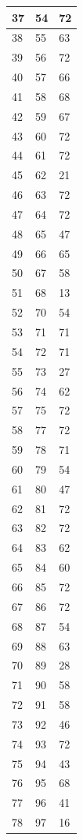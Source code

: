 \begin{tabular}{p{}p{}p{}}
\hline
37 & 54 & 72 \\
\hline
38 & 55 & 63 \\
\hline
39 & 56 & 72 \\
\hline
40 & 57 & 66 \\
\hline
41 & 58 & 68 \\
\hline
42 & 59 & 67 \\
\hline
43 & 60 & 72 \\
\hline
44 & 61 & 72 \\
\hline
45 & 62 & 21 \\
\hline
46 & 63 & 72 \\
\hline
47 & 64 & 72 \\
\hline
48 & 65 & 47 \\
\hline
49 & 66 & 65 \\
\hline
50 & 67 & 58 \\
\hline
51 & 68 & 13 \\
\hline
52 & 70 & 54 \\
\hline
53 & 71 & 71 \\
\hline
54 & 72 & 71 \\
\hline
55 & 73 & 27 \\
\hline
56 & 74 & 62 \\
\hline
57 & 75 & 72 \\
\hline
58 & 77 & 72 \\
\hline
59 & 78 & 71 \\
\hline
60 & 79 & 54 \\
\hline
61 & 80 & 47 \\
\hline
62 & 81 & 72 \\
\hline
63 & 82 & 72 \\
\hline
64 & 83 & 62 \\
\hline
65 & 84 & 60 \\
\hline
66 & 85 & 72 \\
\hline
67 & 86 & 72 \\
\hline
68 & 87 & 54 \\
\hline
69 & 88 & 63 \\
\hline
70 & 89 & 28 \\
\hline
71 & 90 & 58 \\
\hline
72 & 91 & 58 \\
\hline
73 & 92 & 46 \\
\hline
74 & 93 & 72 \\
\hline
75 & 94 & 43 \\
\hline
76 & 95 & 68 \\
\hline
77 & 96 & 41 \\
\hline
78 & 97 & 16 \\

\end{tabular}
